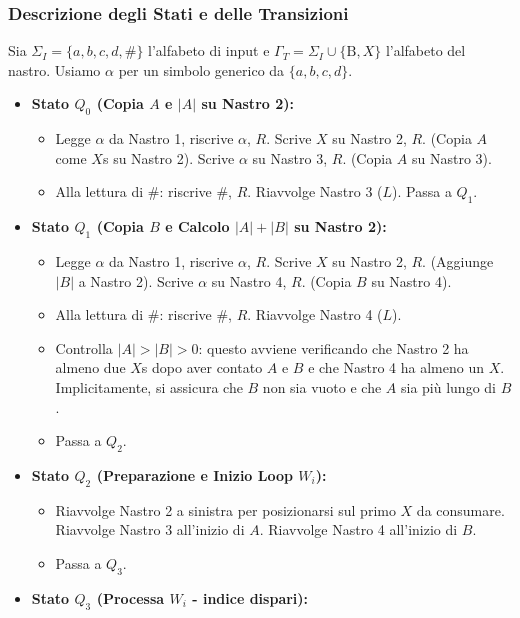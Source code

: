 \documentclass[a4paper]{article}
\newcommand{\B}{\text{B}} %
\begin{document}
\subsubsection{Descrizione degli Stati e delle Transizioni}
Sia $\Sigma_I = \{a,b,c,d,\#\}$ l'alfabeto di input e $\Gamma_T = \Sigma_I \cup \{\B, X\}$ l'alfabeto del nastro. Usiamo $\alpha$ per un simbolo generico da $\{a,b,c,d\}$.

\begin{itemize}
    \item \textbf{Stato $Q_0$ (Copia $A$ e $|A|$ su Nastro 2):}
        \begin{itemize}
            \item Legge $\alpha$ da Nastro 1, riscrive $\alpha$, $R$. Scrive $X$ su Nastro 2, $R$. (Copia $A$ come $X$s su Nastro 2). Scrive $\alpha$ su Nastro 3, $R$. (Copia $A$ su Nastro 3).
            \item Alla lettura di $\#$: riscrive $\#$, $R$. Riavvolge Nastro 3 ($L$). Passa a $Q_1$.
        \end{itemize}
    \item \textbf{Stato $Q_1$ (Copia $B$ e Calcolo $|A|+|B|$ su Nastro 2):}
        \begin{itemize}
            \item Legge $\alpha$ da Nastro 1, riscrive $\alpha$, $R$. Scrive $X$ su Nastro 2, $R$. (Aggiunge $|B|$ a Nastro 2). Scrive $\alpha$ su Nastro 4, $R$. (Copia $B$ su Nastro 4).
            \item Alla lettura di $\#$: riscrive $\#$, $R$. Riavvolge Nastro 4 ($L$).
            \item Controlla $|A|>|B|>0$: questo avviene verificando che Nastro 2 ha almeno due $X$s dopo aver contato $A$ e $B$ e che Nastro 4 ha almeno un $X$. Implicitamente, si assicura che $B$ non sia vuoto e che $A$ sia più lungo di $B$.
            \item Passa a $Q_2$.
        \end{itemize}
    \item \textbf{Stato $Q_2$ (Preparazione e Inizio Loop $W_i$):}
        \begin{itemize}
            \item Riavvolge Nastro 2 a sinistra per posizionarsi sul primo $X$ da consumare. Riavvolge Nastro 3 all'inizio di $A$. Riavvolge Nastro 4 all'inizio di $B$.
            \item Passa a $Q_3$.
        \end{itemize}
    \item \textbf{Stato $Q_3$ (Processa $W_i$ - indice dispari):}

\end{itemize}
\end{document}
